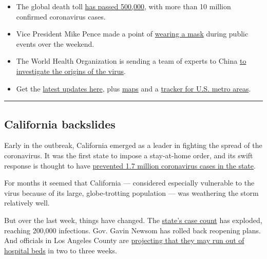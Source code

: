 \begin{itemize}
\item
  The global death toll
  \href{https://www.nytimes3xbfgragh.onion/2020/06/28/world/coronavirus-updates.html\#link-31665a4b}{has
  passed 500,000}, with more than 10 million confirmed coronavirus
  cases.
\item
  Vice President Mike Pence made a point of
  \href{https://www.nytimes3xbfgragh.onion/2020/06/29/world/coronavirus-updates.html\#link-56ea353b}{wearing
  a mask} during public events over the weekend.
\item
  The World Health Organization is sending a team of experts to China
  \href{https://www.nytimes3xbfgragh.onion/2020/06/29/world/coronavirus-live-updates.html\#link-9c42599}{to
  investigate the origins of the virus}.
\item
  Get the
  \href{https://www.nytimes3xbfgragh.onion/news-event/coronavirus}{latest
  updates here}, plus
  \href{https://www.nytimes3xbfgragh.onion/interactive/2020/world/asia/china-wuhan-coronavirus-maps.html?action=click\&pgtype=Article\&state=default\&module=styln-coronavirus\&variant=show\&region=TOP_BANNER\&context=storyline_menu}{maps}
  and a
  \href{https://www.nytimes3xbfgragh.onion/interactive/2020/04/03/upshot/coronavirus-metro-area-tracker.html}{tracker
  for U.S. metro areas}.
\end{itemize}

\begin{center}\rule{0.5\linewidth}{\linethickness}\end{center}

\hypertarget{california-backslides}{%
\subsection{California backslides}\label{california-backslides}}

Early in the outbreak, California emerged as a leader in fighting the
spread of the coronavirus. It was the first state to impose a
stay-at-home order, and its swift response is thought to have
\href{https://www.sfchronicle.com/bayarea/article/Study-Shelter-in-place-helped-avert-4-8-million-15325645.php}{prevented
1.7 million coronavirus cases in the state}.

For months it seemed that California --- considered especially
vulnerable to the virus because of its large, globe-trotting population
--- was weathering the storm relatively well.

But over the last week, things have changed. The
\href{https://www.nytimes3xbfgragh.onion/interactive/2020/us/california-coronavirus-cases.html}{state's
case count} has exploded, reaching 200,000 infections. Gov. Gavin Newsom
has rolled back reopening plans. And officials in Los Angeles County are
\href{https://www.latimes.com/california/story/2020-06-29/l-a-county-issues-dire-warning-amid-alarming-increases-in-coronavirus}{projecting
that they may run out of hospital beds} in two to three weeks.

